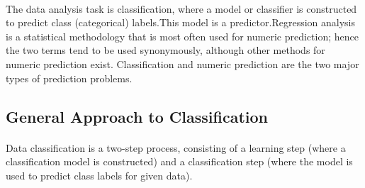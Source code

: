 \paragraph{}
The data analysis task is classification, where a model or classifier is constructed to predict class (categorical) labels.This model is a predictor.Regression analysis is a statistical methodology that is most often used for numeric prediction; hence the two terms tend to be used synonymously, although other methods for numeric prediction exist. Classification and numeric prediction are the two major types of prediction problems.


\subsection{General Approach to Classification}
\paragraph{}
 Data classification is a two-step process, consisting of a learning step
(where a classification model is constructed) and a classification step (where the model is used to predict class
labels for given data).
